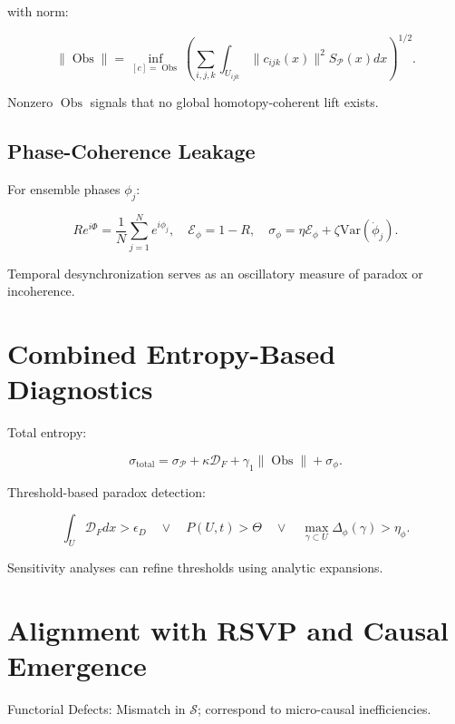 \documentclass[12pt]{article}
\theoremstyle{plain}
\begin{document}
with norm:

\begin{equation}
\|\operatorname{Obs}\| = \inf_{[c]=\operatorname{Obs}} \left( \sum_{i,j,k} \int_{U_{ijk}} \|c_{ijk}(x)\|^2 S_\mathcal{P}(x) dx \right)^{1/2}.
\end{equation}

Nonzero \(\operatorname{Obs}\) signals that no global homotopy-coherent lift exists.

\subsection{Phase-Coherence Leakage}

For ensemble phases \(\phi_j\):

\begin{equation}
R e^{i\Phi} = \frac{1}{N}\sum_{j=1}^N e^{i\phi_j}, \quad \mathcal{E}_\phi = 1 - R, \quad \sigma_\phi = \eta \mathcal{E}_\phi + \zeta \mathrm{Var}(\dot{\phi}_j).
\end{equation}

Temporal desynchronization serves as an oscillatory measure of paradox or incoherence.

\section{Combined Entropy-Based Diagnostics}

Total entropy:

\begin{equation}
\sigma_{\mathrm{total}} = \sigma_\mathcal{P} + \kappa \mathcal{D}_F + \gamma_1 \|\operatorname{Obs}\| + \sigma_\phi.
\end{equation}

Threshold-based paradox detection:

\begin{equation}
\int_U \mathcal{D}_F dx > \epsilon_D \quad \vee \quad P(U,t) > \Theta \quad \vee \quad \max_{\gamma \subset U} \Delta_\phi(\gamma) > \eta_\phi.
\end{equation}

Sensitivity analyses can refine thresholds using analytic expansions.

\section{Alignment with RSVP and Causal Emergence}

Functorial Defects: Mismatch in \(\mathcal{S}\); correspond to micro-causal inefficiencies.
\end{document}
